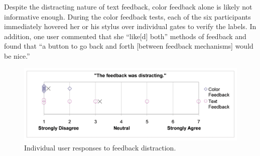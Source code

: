 \documentclass{egpubl}
\begin{document}

Despite the distracting nature of text feedback, color feedback alone
is likely not informative enough.  During the color feedback tests,
each of the six participants immediately hovered her or his stylus
over individual gates to verify the labels.  In
addition, one user commented that she ``like[d] both'' methods of
feedback and found that ``a button to go back and forth [between
feedback mechanisms] would be nice.''



\begin{figure}[tb]
  \centering
  \includegraphics[width=1.0\linewidth]{feedbackDistracting.png}
  \caption{\label{fig:feedbackDistracting}
           Individual user responses to feedback distraction.}
\end{figure}
\end{document}
